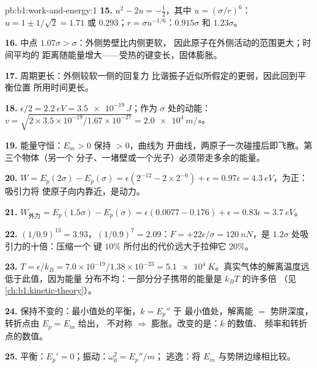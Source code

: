 \begin{solution}{pb:b1:work-and-energy:1}
\textbf{15.} $u^2 - 2u = -\tfrac12$，其中 $u = (\sigma/r)^6$：$u = 1 \pm 1/\sqrt2
= 1.71$ 或 $0.293$；$r = \sigma u^{-1/6}$：$0.915\sigma$ 和 $1.23\sigma$。

\textbf{16.} 中点 $1.07\sigma > \sigma$：外侧势壁比内侧更软，
因此原子在外侧活动的范围更大；时间平均的
距离随能量增大——受热的键变长，固体膨胀。

\textbf{17.} 周期更长：外侧较软一侧的回复力
比谐振子近似所假定的更弱，因此回到平衡位置
所用时间更长。

\textbf{18.} $\epsilon/2 = \qty{2.2}{eV} = \qty{3.5e-19}{J}$；作为
$\sigma$ 处的动能：$v = \sqrt{2 \times 3.5\times10^{-19}/1.67\times10^{-27}}
= \qty{2.0e4}{m/s}$。

\textbf{19.} 能量守恒：$E_m > 0$ 保持 $> 0$，曲线为
开曲线，两原子一次碰撞后即飞散。第三个物体（另一个
分子、一堵壁或一个光子）必须带走多余的能量。

\textbf{20.} $W = E_p(2\sigma) - E_p(\sigma) = \epsilon(2^{-12} - 2 \times 2^{-6})
+ \epsilon = 0.97\epsilon = \qty{4.3}{eV}$，为正：吸引力将
使原子向内靠近，是动力。

\textbf{21.} $W_{\text{外力}} = E_p(1.5\sigma) - E_p(\sigma) = \epsilon(0.0077 -
0.176) + \epsilon = 0.83\epsilon = \qty{3.7}{eV}$。

\textbf{22.} $(1/0.9)^{13} = 3.93$，$(1/0.9)^7 = 2.09$：$F = +22\epsilon/\sigma
= \qty{+120}{nN}$，是 $1.2\sigma$ 处吸引力的十倍：压缩一个
键 $10\%$ 所付出的代价远大于拉伸它 $20\%$。

\textbf{23.} $T = \epsilon/k_B = 7.0\times10^{-19}/1.38\times10^{-23} =
\qty{5.1e4}{K}$。真实气体的解离温度远低于此值，因为能量
分布不均：一部分分子携带的能量是 $k_BT$ 的许多倍
（见\cref{ch:b1:kinetic-theory}）。

\textbf{24.} 保持不变的：最小值处的平衡，$k = E_p''$ 于
最小值处，解离能 $=$ 势阱深度，转折点由 $E_p = E_m$ 给出，
不对称 $\Rightarrow$ 膨胀。改变的是：$k$ 的数值、
频率和转折点的数值。

\textbf{25.} 平衡：$E_p' = 0$；振动：$\omega_0^2 = E_p''/m$；
逃逸：将 $E_m$ 与势阱边缘相比较。
\end{solution}
